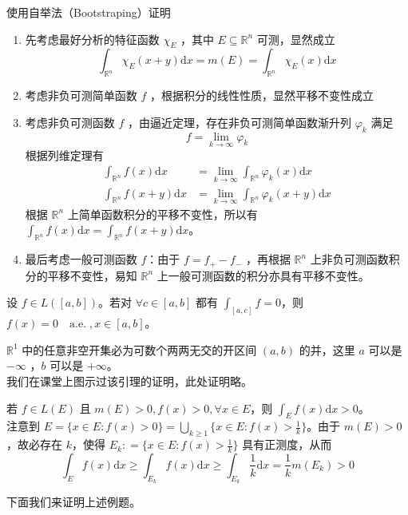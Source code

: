 \documentclass{ctexbook}
\newcommand{\no}{\noindent}
\newcommand{\pro}{\no{\bf 证明：}}
\newcommand{\EXP}{\no {\bf 例}\quad}
\newcommand{\R}{\mathbb{R}}
\newcommand{\nae}{\mathrm{\quad a.e.\; }}
\newcommand{\ITEMS}{\begin{enumerate}[leftmargin=4em]}
\newcommand{\ITEME}{\end{enumerate}}
\begin{document}
\pro 使用自举法（Bootstraping）证明

\ITEMS
\item 先考虑最好分析的特征函数 $\chi_{E}$ ，其中 $E \subseteq \R^n$ 可测，显然成立
\[
\int_{\R^n} \chi_{E} (x+y) \mathrm{d}x  = m(E) = \int_{\R^n} \chi_{E}(x) \mathrm{d}x 
\] 

\item 考虑非负可测简单函数 $f$ ，根据积分的线性性质，显然平移不变性成立

\item 考虑非负可测函数 $f$ ，由逼近定理，存在非负可测简单函数渐升列 $\varphi_k$ 满足
\[
f = \lim_{k\to\infty}\varphi_k
\]
根据列维定理有
\[
\begin{aligned}
	\int_{\R^n} f (x)\mathrm{d}x &= \lim_{k\to\infty} \int_{\R^n} \varphi_k (x)\mathrm{d}x \\
	\int_{\R^n} f (x+y)\mathrm{d}x  &= \lim_{k\to\infty} \int_{\R^n} \varphi_k (x+y)\mathrm{d}x 
\end{aligned}
\]
根据 $\R^n$ 上简单函数积分的平移不变性，所以有 $\int_{\R^n} f (x)\mathrm{d}x  =\int_{\R^n} f (x+y)\mathrm{d}x $。

\item 最后考虑一般可测函数 $f$：由于 $f = f_+ - f_-$ ，再根据 $\R^n$ 上非负可测函数积分的平移不变性，易知 $\R^n$ 上一般可测函数的积分亦具有平移不变性。


\ITEME


\EXP

设 $f\in L([a,b])$。若对 $\forall c \in [a,b]$ 都有 $\int_{[a,c]}f = 0$，则 $f(x) = 0 \nae ,x\in[a,b]$。\\

\no {\bf 引理1}

$\R^1$ 中的任意非空开集必为可数个两两无交的开区间 $(a,b)$ 的并，这里 $a$ 可以是 $-\infty$ ，$b$ 可以是 $+\infty$。\\
我们在课堂上图示过该引理的证明，此处证明略。\\

\no {\bf 引理2}

若 $f\in L(E)$ 且 $m(E)>0, f(x)>0, \forall x\in E$，则 $\int_Ef(x)\mathrm{d}x>0$。\\
\pro 注意到 $E=\{x\in E: f(x)>0\}=\bigcup_{k\ge1}\{x\in E: f(x)>\frac1k\}$。由于 $m(E)>0$，故必存在 $k$，使得 $E_k: =\{x\in E: f(x)>\frac1k\}$ 具有正测度，从而
$$\int_Ef(x)\mathrm{d}x\ge \int_{E_k}f(x)\mathrm{d}x\ge \int_{E_k}\frac 1k\mathrm{d}x=\frac1k m(E_k)>0$$

下面我们来证明上述例题。\\
\end{document}

